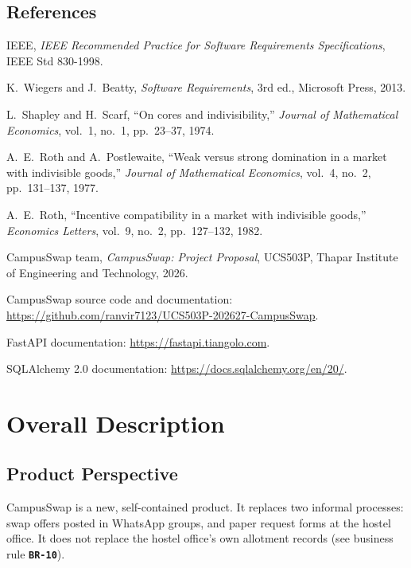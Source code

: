 \documentclass[11pt,a4paper,parskip=half,toc=listof]{scrreprt}
\newcommand{\Req}[1]{\textbf{\texttt{#1}}}
\begin{document}
\section{References}

\begin{enumerate}[label={[\arabic*]},ref={\arabic*},leftmargin=2.2em]
  \item IEEE, \emph{IEEE Recommended Practice for Software Requirements
    Specifications}, IEEE Std 830-1998.
  \item K.~Wiegers and J.~Beatty, \emph{Software Requirements}, 3rd ed.,
    Microsoft Press, 2013.
  \item\label{ref:shapley} L.~Shapley and H.~Scarf, ``On cores and indivisibility,''
    \emph{Journal of Mathematical Economics}, vol.~1, no.~1, pp.~23--37,
    1974.
  \item A.~E.~Roth and A.~Postlewaite, ``Weak versus strong domination in a
    market with indivisible goods,'' \emph{Journal of Mathematical
    Economics}, vol.~4, no.~2, pp.~131--137, 1977.
  \item\label{ref:roth82} A.~E.~Roth, ``Incentive compatibility in a market with indivisible
    goods,'' \emph{Economics Letters}, vol.~9, no.~2, pp.~127--132, 1982.
  \item CampusSwap team, \emph{CampusSwap: Project Proposal}, UCS503P,
    Thapar Institute of Engineering and Technology, 2026.
  \item CampusSwap source code and documentation:
    \url{https://github.com/ranvir7123/UCS503P-202627-CampusSwap}.
  \item FastAPI documentation: \url{https://fastapi.tiangolo.com}.
  \item SQLAlchemy 2.0 documentation:
    \url{https://docs.sqlalchemy.org/en/20/}.
\end{enumerate}

\chapter{Overall Description}\label{ch:overall}

\section{Product Perspective}

CampusSwap is a new, self-contained product. It replaces two informal
processes: swap offers posted in WhatsApp groups, and paper request forms
at the hostel office. It does not replace the hostel office's own
allotment records (see business rule \Req{BR-10}).
\end{document}

